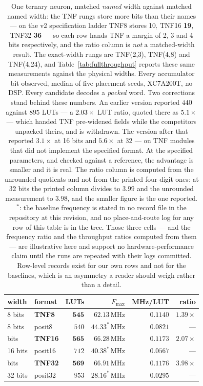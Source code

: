 \documentclass[11pt]{article}
\theoremstyle{definition}
\begin{document}
\begin{table}[t]\centering
\caption{One ternary neuron, matched \emph{named} width against matched named
width: the TNF rungs store more bits than their names --- on the v2
specification ladder TNF8 stores 10, TNF16 \textbf{19}, TNF32 \textbf{36} ---
so each row hands TNF a margin of 2, 3 and 4 bits respectively, and the ratio
column is \emph{not} a matched-width result. The exact-width rungs are
TNF(2,3), TNF(4,8) and TNF(4,24), and Table~\ref{tab:fullthroughput} reports
these same measurements against the physical widths. Every
accumulator bit observed, median of five placement seeds, XC7A200T, no DSP.
Every candidate decodes a \emph{packed} word. Two corrections stand behind these
numbers. An earlier version reported $440$ against $895$ LUTs --- a $2.03\times$
LUT ratio, quoted there as $5.1\times$ --- which handed TNF pre-widened fields while the competitors unpacked
theirs, and is withdrawn. The version after that reported $3.1\times$ at 16 bits
and $5.6\times$ at 32 --- on TNF modules that did not implement the specified
format. At the specified parameters, and checked against a reference, the
advantage is smaller and it is real. The ratio column is computed from the
unrounded quotients and not from the printed four-digit ones: at 32 bits the
printed column divides to $3.99$ and the unrounded measurement to $3.98$, and the
smaller figure is the one reported. $^{\ast}$: the baseline frequency is stated in
no record file in the repository at this revision, and no place-and-route log for
any row of this table is in the tree. Those three cells --- and the frequency ratio
and the throughput ratios computed from them --- are illustrative here and support
no hardware-performance claim until the runs are repeated with their logs
committed. Row-level records exist for our own rows and not for the baselines,
which is an asymmetry a reader should weigh rather than a detail.}
\label{tab:tnet}
\begin{tabular}{llrrrr}
\toprule
width & format & LUTs & $F_{\max}$ & MHz/LUT & ratio \\
\midrule
8 bits & \textbf{TNF8} & $\mathbf{545}$ & $62.13$\,MHz & $\mathbf{0.1140}$ & $\mathbf{1.39\times}$ \\
8 bits & posit8 & $540$ & $44.33^{\ast}$\,MHz & $0.0821$ & --- \\
\addlinespace
16 bits & \textbf{TNF16} & $\mathbf{565}$ & $66.28$\,MHz & $\mathbf{0.1173}$ & $\mathbf{2.07\times}$ \\
16 bits & posit16 & $712$ & $40.38^{\ast}$\,MHz & $0.0567$ & --- \\
\addlinespace
32 bits & \textbf{TNF32} & $\mathbf{569}$ & $66.91$\,MHz & $\mathbf{0.1176}$ & $\mathbf{3.98\times}$ \\
32 bits & posit32 & $953$ & $28.16^{\ast}$\,MHz & $0.0295$ & --- \\
\bottomrule
\end{tabular}
\end{table}
\end{document}
